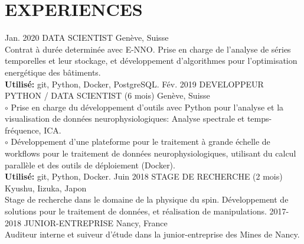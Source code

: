 \documentclass[]{cv-style}
\begin{document}
\section{EXPERIENCES}
\begin{entrylist}
%
\entry
{Jan. 2020}
{DATA SCIENTIST}
{Genève, Suisse}
{\\
    Contrat à durée determinée avec E-NNO. Prise en charge de l'analyse
    de séries temporelles et leur stockage, et développement d'algorithmes
    pour l'optimisation energétique des bâtiments.\\
    \textbf{Utilisé:} git, Python, Docker, PostgreSQL.
\vspace{0.2cm}
}
%
\entry
{Fév. 2019}
{DEVELOPPEUR PYTHON / DATA SCIENTIST (6 mois)}
{Genève, Suisse}
{\\
    $\circ$ Prise en charge du développement d'outils avec Python pour 
    l'analyse et la visualisation de données neurophysiologiques: Analyse 
    spectrale et temps-fréquence, ICA.\\
    $\circ$ Développement d'une plateforme pour le traitement à grande échelle 
    de workflows pour le traitement de données neurophysiologiques, utilisant 
    du calcul parallèle et des outils de déploiement (Docker). \\
\textbf{Utilisé:} git, Python, Docker.
\vspace{0.2cm}
}
\entry
{Juin 2018}
{STAGE DE RECHERCHE (2 mois)}
{Kyushu, Iizuka, Japon}
{\\
    Stage de recherche dans le domaine de la physique du spin. Développement 
    de solutions pour le traitement de données, et réalisation de 
    manipulations. 
\vspace{0.2cm}
}
\entry
{2017-2018}
{JUNIOR-ENTREPRISE}
{Nancy, France}
{\\
    Auditeur interne et suiveur d'étude dans la junior-entreprise des Mines 
    de Nancy.
\vspace{0.2cm}
}
%
\end{entrylist}
\newpage
\hphantom\\
%
\end{document}
